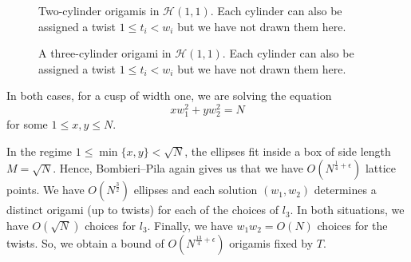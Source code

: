 \documentclass[a4paper,11pt]{amsart}
\numberwithin{equation}{section}
\numberwithin{figure}{section}
\numberwithin{table}{section}
\newcommand{\calH}{\mathcal{H}}
\begin{document}
\begin{figure}[t]
    \centering
    \hspace{3cm}
    \caption{Two-cylinder origamis in $\calH(1,1)$. Each cylinder can also be assigned a twist $1\leq t_i<w_i$ but we have not drawn them here.}
    \label{fig:H(1,1)-two-cylinder}
\end{figure}

\begin{figure}[t]
    \centering
    \caption{A three-cylinder origami in $\calH(1,1)$. Each cylinder can also be assigned a twist $1\leq t_i<w_i$ but we have not drawn them here.}
    \label{fig:H(1,1)-three-cylinder}
\end{figure}

In both cases, for a cusp of width one, we are solving the equation
\[xw_1^2+yw_2^2 = N\]
for some $1\leq x,y\leq N$.

In the regime $1\leq \min\{x,y\}<\sqrt{N}$, the ellipses fit inside a box of side length $M = \sqrt{N}$. Hence, Bombieri--Pila again gives us that we have $O(N^{\frac{1}{4}+\epsilon})$ lattice points. We have $O(N^{\frac{3}{2}})$ ellipses and each solution $(w_1,w_2)$ determines a distinct origami (up to twists) for each of the choices of $l_3$. In both situations, we have $O(\sqrt{N})$ choices for $l_3$. Finally, we have $w_1w_2 = O(N)$ choices for the twists. So, we obtain a bound of $O(N^{\frac{13}{4}+\epsilon})$ origamis fixed by $T$.
\end{document}

